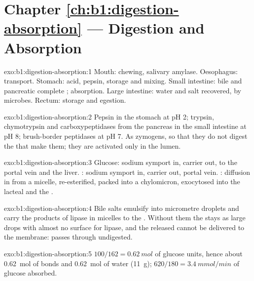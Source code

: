 \section*{Chapter \ref{ch:b1:digestion-absorption} --- Digestion and Absorption}

\begin{solution}{exo:b1:digestion-absorption:1}
Mouth: chewing, salivary amylase. Oesophagus: transport. Stomach:
acid, pepsin, storage and mixing. Small intestine: bile and pancreatic
 complete ; absorption. Large intestine: water and
salt recovered,  by microbes. Rectum: storage and
egestion.
\end{solution}

\begin{solution}{exo:b1:digestion-absorption:2}
Pepsin in the stomach at pH 2; trypsin, chymotrypsin and
carboxypeptidases from the pancreas in the small intestine at pH 8;
brush-border peptidases at pH 7. As zymogens, so that they do not
digest the  that make them; they are activated only in the lumen.
\end{solution}

\begin{solution}{exo:b1:digestion-absorption:3}
Glucose: sodium symport in, carrier out, to the portal vein and the
liver. : sodium symport in, carrier out, portal vein. : diffusion in from a micelle, re-esterified, packed into a
chylomicron, exocytosed into the lacteal and the .
\end{solution}

\begin{solution}{exo:b1:digestion-absorption:4}
Bile salts emulsify  into micrometre droplets and carry the
products of lipase in micelles to the . Without them the
 stays as large drops with almost no surface for lipase, and the
 released cannot be delivered to the membrane:  passes
through undigested.
\end{solution}

\begin{solution}{exo:b1:digestion-absorption:5}
$100/162 = \qty{0.62}{mol}$ of glucose units, hence about
\qty{0.62}{mol} of bonds and \qty{0.62}{mol} of water (\qty{11}{g});
$620/180 = \qty{3.4}{mmol/min}$ of glucose absorbed.
\end{solution}

